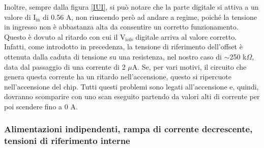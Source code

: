 Inoltre, sempre dalla figura \ref{IUI}, si può notare che la parte digitale si attiva a un valore di $\mathrm{I_{in}}$ di 0.56 A, non riuscendo però ad andare a regime, poiché la tensione in ingresso non è abbastanza alta da consentire un corretto funzionamento.
Questo è dovuto al ritardo con cui il $\mathrm{V_{iofs}}$ digitale arriva al valore corretto.
Infatti, come introdotto in precedenza, la tensione di riferimento dell'offset è ottenuta dalla caduta di tensione su una resistenza, nel nostro caso di $\sim$250 k$\Omega$, data dal passaggio di una corrente di 2 $\mu$A.
Se, per vari motivi, il circuito che genera questa corrente ha un ritardo nell'accensione, questo si ripercuote nell'accensione del chip.  
Tutti questi problemi sono legati all'accensione e, quindi, dovranno scomparire con uno scan eseguito partendo da valori alti di corrente per poi scendere fino a 0 A.

% 
%
%



\subsubsection{Alimentazioni indipendenti, rampa di corrente decrescente, tensioni di riferimento interne}

